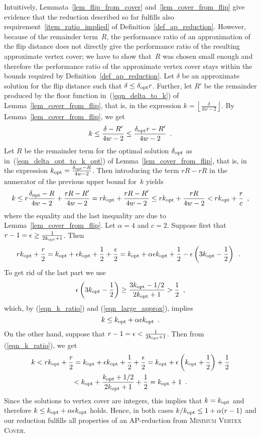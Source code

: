 \documentclass[11pt,a4paper]{article}
\begin{document}
Intuitively, Lemmata~\ref{lem_flip_from_cover} and~\ref{lem_cover_from_flip} give evidence that the reduction described so far fulfills also requirement~\ref{item_ratio_implied} of Definition~\ref{def_ap_reduction}.
However, because of the remainder term~$R$, the performance ratio of an approximation of the flip distance does not directly give the performance ratio of the resulting approximate vertex cover;
we have to show that~$R$ was chosen small enough and therefore the performance ratio of the approximate vertex cover stays within the bounds required by Definition~\ref{def_ap_reduction}.
Let $\delta$ be an approximate solution for the flip distance such that $\delta \leq \delta_{\mathrm{opt}} r$.
Further, let $R'$ be the remainder produced by the floor function in~(\ref{eqn_delta_to_k}) of Lemma~\ref{lem_cover_from_flip}, that is, in the expression $k = \left \lfloor \frac{\delta}{4w-2} \right \rfloor$.
By Lemma~\ref{lem_cover_from_flip}, we get
\[
  k \leq \frac{\delta - R'}{4w-2} \leq \frac{\delta_{\mathrm{opt}} r - R'}{4w-2} \enspace .
\]
Let $R$ be the remainder term for the optimal solution $\delta_{\mathrm{opt}}$ as in~(\ref{eqn_delta_opt_to_k_opt}) of Lemma~\ref{lem_cover_from_flip}, that is, in the expression $k_{\mathrm{opt}} = \frac{\delta_{\mathrm{opt}} - R}{4w-2}$.
Then introducing the term $rR - rR$ in the numerator of the previous upper bound for~$k$ yields
\begin{equation}\label{eqn_k_ratio}
 k \leq r\frac{\delta_{\mathrm{opt}} - R}{4w-2} + \frac{rR - R'}{4w-2} = r k_{\mathrm{opt}} + \frac{rR - R'}{4w-2} \leq r k_{\mathrm{opt}} + \frac{rR }{4w-2} < r k_{\mathrm{opt}} + \frac{r}{c} \enspace ,
\end{equation}
where the equality and the last inequality are due to Lemma~\ref{lem_cover_from_flip}.
Let $\alpha = 4$ and $c=2$.
Suppose first that $r-1 = \epsilon \geq \frac{1}{2k_{\mathrm{opt}} + 1}$.
Then
\begin{equation}\label{eqn_large_approx}
 r k_{\mathrm{opt}} + \frac{r}{2} = k_{\mathrm{opt}} + \epsilon k_{\mathrm{opt}} + \frac{1}{2} + \frac{\epsilon}{2} = k_{\mathrm{opt}} + \alpha \epsilon k_{\mathrm{opt}} + \frac{1}{2} - \epsilon \left (3k_{\mathrm{opt}} - \frac{1}{2} \right ) \enspace . \enspace
\end{equation}
To get rid of the last part we use
\[
 \epsilon \left (3k_{\mathrm{opt}} - \frac{1}{2} \right) \geq \frac{3k_{\mathrm{opt}}-1/2}{2k_{\mathrm{opt}}+1} > \frac{1}{2} \enspace ,
\]
which, by (\ref{eqn_k_ratio}) and (\ref{eqn_large_approx}), implies
\[
 k \leq k_{\mathrm{opt}} + \alpha \epsilon k_{\mathrm{opt}} \enspace .
\]
On the other hand, suppose that $r-1 = \epsilon < \frac{1}{2k_{\mathrm{opt}} +1}$.
Then from (\ref{eqn_k_ratio}), we get
\begin{gather*}
 k < r k_{\mathrm{opt}} + \frac{r}{2} = k_{\mathrm{opt}} + \epsilon k_{\mathrm{opt}} + \frac{1}{2} + \frac{\epsilon}{2} = k_{\mathrm{opt}} + \epsilon\left (k_{\mathrm{opt}} + \frac{1}{2} \right ) + \frac{1}{2}\\
 < k_{\mathrm{opt}} + \frac{k_{\mathrm{opt}} + 1/2}{2 k_{\mathrm{opt}} + 1} + \frac{1}{2} = k_{\mathrm{opt}} + 1 \enspace .
\end{gather*}
Since the solutions to vertex cover are integers, this implies that $k = k_{\mathrm{opt}}$ and therefore $ k \leq k_{\mathrm{opt}} + \alpha \epsilon k_{\mathrm{opt}}$ holds.
Hence, in both cases $k / k_{\mathrm{opt}} \leq 1 + \alpha(r-1)$ and our reduction fulfills all properties of an AP-reduction from \textsc{Minimum Vertex Cover}.
\end{document}
